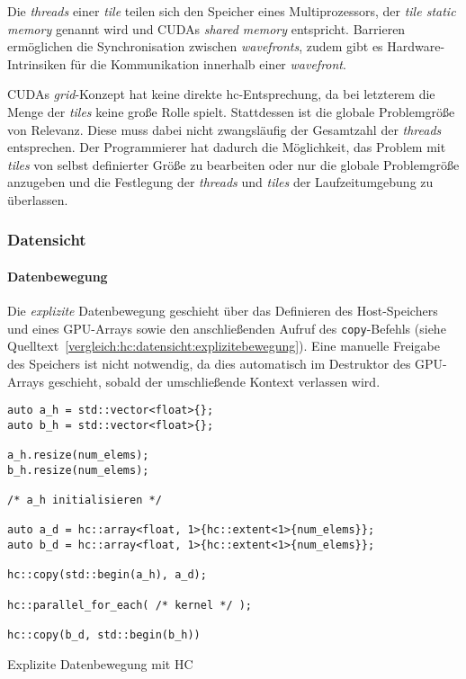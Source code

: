 Die \textit{threads} einer \textit{tile} teilen sich den Speicher eines
Multiprozessors, der \textit{tile static memory} genannt wird und CUDAs
\textit{shared memory} entspricht. Barrieren ermöglichen die Synchronisation
zwischen \textit{wavefronts}, zudem gibt es Hardware-Intrinsiken für die
Kommunikation innerhalb einer \textit{wavefront}.

CUDAs \textit{grid}-Konzept hat keine direkte \gls{hc}-Entsprechung, da
bei letzterem die Menge der \textit{tiles} keine große Rolle spielt. Stattdessen
ist die globale Problemgröße von Relevanz. Diese muss dabei nicht zwangsläufig
der Gesamtzahl der \textit{threads} entsprechen. Der Programmierer hat dadurch
die Möglichkeit, das Problem mit \textit{tiles} von selbst definierter Größe
zu bearbeiten oder nur die globale Problemgröße anzugeben und die Festlegung der
\textit{threads} und \textit{tiles} der Laufzeitumgebung zu überlassen.

\subsubsection{Datensicht}

\paragraph{Datenbewegung}

Die \textit{explizite} Datenbewegung geschieht über das Definieren des
Host-Speichers und eines GPU-Arrays sowie den anschließenden Aufruf des
\texttt{copy}-Befehls (siehe
Quelltext~\ref{vergleich:hc:datensicht:explizitebewegung}). Eine manuelle
Freigabe des Speichers ist nicht notwendig, da dies automatisch im Destruktor
des GPU-Arrays geschieht, sobald der umschließende Kontext verlassen wird.

\begin{code}
    \begin{verbatim}
auto a_h = std::vector<float>{};
auto b_h = std::vector<float>{};

a_h.resize(num_elems);
b_h.resize(num_elems);

/* a_h initialisieren */

auto a_d = hc::array<float, 1>{hc::extent<1>{num_elems}};
auto b_d = hc::array<float, 1>{hc::extent<1>{num_elems}};

hc::copy(std::begin(a_h), a_d);

hc::parallel_for_each( /* kernel */ );

hc::copy(b_d, std::begin(b_h))
    \end{verbatim}
    \caption{Explizite Datenbewegung mit HC}
    \label{vergleich:hc:datensicht:explizitebewegung}
\end{code}

